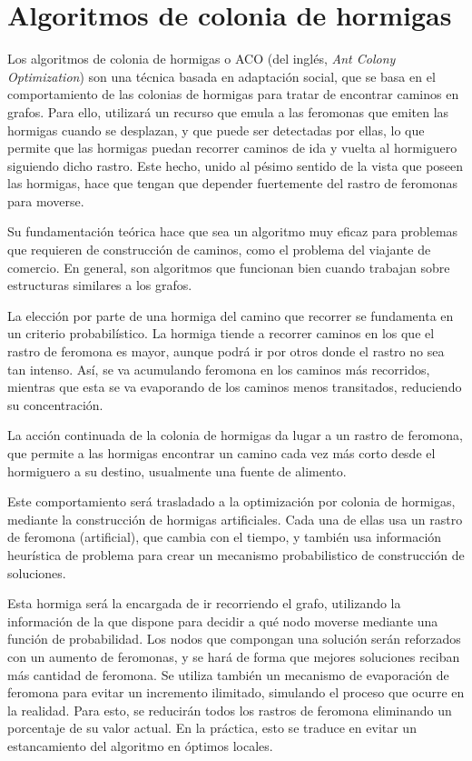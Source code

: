 \section{Algoritmos de colonia de hormigas}

Los algoritmos de colonia de hormigas o ACO (del inglés, \textit{Ant Colony Optimization}) son una técnica
basada en adaptación social, que se basa en el comportamiento de las colonias de hormigas para tratar
de encontrar caminos en grafos. Para ello, utilizará un recurso que emula a las feromonas que emiten las
hormigas cuando se desplazan, y que puede ser detectadas por ellas, lo que permite que las hormigas puedan
recorrer caminos de ida y vuelta al hormiguero siguiendo dicho rastro. Este hecho, unido al pésimo sentido
de la vista que poseen las hormigas, hace que tengan que depender fuertemente del rastro de feromonas para
moverse.

Su fundamentación teórica hace que sea un algoritmo muy eficaz para problemas que requieren de construcción
de caminos, como el problema del viajante de comercio. En general, son algoritmos que funcionan bien
cuando trabajan sobre estructuras similares a los grafos.

La elección por parte de una hormiga del camino que recorrer se fundamenta en un criterio probabilístico.
La hormiga tiende a recorrer caminos en los que el rastro de feromona es mayor, aunque podrá ir por otros
donde el rastro no sea tan intenso. Así, se va acumulando feromona en los caminos más recorridos, mientras
que esta se va evaporando de los caminos menos transitados, reduciendo su concentración.

La acción continuada de la colonia de hormigas da lugar a un rastro de feromona, que permite a las hormigas
encontrar un camino cada vez más corto desde el hormiguero a su destino, usualmente una fuente de alimento.

Este comportamiento será trasladado a la optimización por colonia de hormigas, mediante la construcción
de hormigas artificiales. Cada una de ellas usa un rastro de feromona (artificial), que cambia con el
tiempo, y también usa información heurística de problema para crear un mecanismo probabilistico de
construcción de soluciones.

Esta hormiga será la encargada de ir recorriendo el grafo, utilizando la información de la que dispone para
decidir a qué nodo moverse mediante una función de probabilidad. Los nodos que compongan una solución
serán reforzados con un aumento de feromonas, y se hará de forma que mejores soluciones reciban más cantidad
de feromona. Se utiliza también un mecanismo de evaporación de feromona para evitar un incremento ilimitado,
simulando el proceso que ocurre en la realidad. Para esto, se reducirán todos los rastros de feromona eliminando
un porcentaje de su valor actual. En la práctica, esto se traduce en evitar un estancamiento del algoritmo en
óptimos locales.

